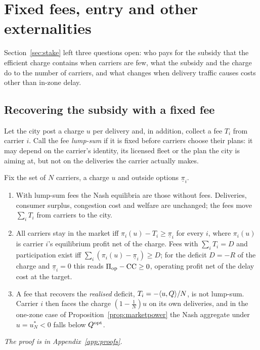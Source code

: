 \section{Fixed fees, entry and other externalities}\label{sec:ext}
Section~\ref{sec:stake} left three questions open: who pays for the subsidy that the efficient charge contains when carriers are few, what the subsidy and the charge do to the number of carriers, and what changes when delivery traffic causes costs other than in-zone delay.

\subsection{Recovering the subsidy with a fixed fee}\label{sec:fees}
Let the city post a charge $u$ per delivery and, in addition, collect a fee $T_i$ from carrier $i$. Call the fee \emph{lump-sum} if it is fixed before carriers choose their plans: it may depend on the carrier's identity, its licensed fleet or the plan the city is aiming at, but not on the deliveries the carrier actually makes.

\begin{proposition}\label{prop:fee}
Fix the set of $N$ carriers, a charge $u$ and outside options $\underline\pi_i$.
\begin{enumerate}
\item[(a)] With lump-sum fees the Nash equilibria are those without fees. Deliveries, consumer surplus, congestion cost and welfare are unchanged; the fees move $\sum_iT_i$ from carriers to the city.
\item[(b)] All carriers stay in the market iff $\pi_i(u)-T_i\ge\underline\pi_i$ for every $i$, where $\pi_i(u)$ is carrier $i$'s equilibrium profit net of the charge. Fees with $\sum_iT_i=D$ and participation exist iff $\sum_i(\pi_i(u)-\underline\pi_i)\ge D$; for the deficit $D=-R$ of the charge and $\underline\pi_i=0$ this reads $\Pi_{\rm op}-\mathrm{CC}\ge0$, operating profit net of the delay cost at the target.
\item[(c)] A fee that recovers the \emph{realised} deficit, $T_i=-\langle u,Q\rangle/N$, is not lump-sum. Carrier $i$ then faces the charge $(1-\tfrac1N)u$ on its own deliveries, and in the one-zone case of Proposition~\ref{prop:marketpower} the Nash aggregate under $u=u_N^*<0$ falls below $Q^{\mathrm{opt}}$.
\end{enumerate}
\end{proposition}
\emph{The proof is in Appendix~\ref{app:proofs}.}

